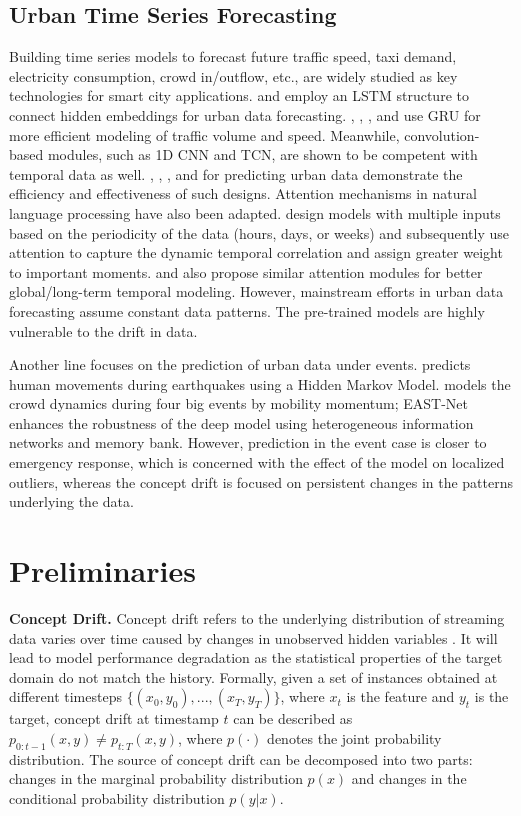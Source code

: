 \documentclass[sigconf]{acmart}
\begin{document}
\subsection{Urban Time Series Forecasting}
Building time series models to forecast future traffic speed, taxi demand, electricity consumption, crowd in/outflow, etc., are widely studied as key technologies for smart city applications. \cite{yao2018deep} and \cite{cui2019traffic} employ an LSTM structure to connect hidden embeddings for urban data forecasting. \cite{lai2018modeling}, \cite{li2018diffusion}, \cite{bai2020adaptive}, and \cite{zhao2019t} use GRU for more efficient modeling of traffic volume and speed.  Meanwhile, convolution-based modules, such as 1D CNN and TCN, are shown to be competent with temporal data as well. \cite{yu2018spatio}, \cite{shih2019temporal}, \cite{wu2019graph}, and \cite{wu2020connecting} for predicting urban data demonstrate the efficiency and effectiveness of such designs. Attention mechanisms in natural language processing have also been adapted. \cite{yao2019revisiting,guo2019attention} design models with multiple inputs based on the periodicity of the data (hours, days, or weeks) and subsequently use attention to capture the dynamic temporal correlation and assign greater weight to important moments. \cite{zheng2020gman} and \cite{xu2020spatial} also propose similar attention modules for better global/long-term temporal modeling. However, mainstream efforts in urban data forecasting assume constant data patterns. The pre-trained models are highly vulnerable to the drift in data.

Another line focuses on the prediction of urban data under events. \cite{song2014prediction} predicts human movements during earthquakes using a Hidden Markov Model. \cite{jiang2019deepurbanevent,jiang2023learning} models the crowd dynamics during four big events by mobility momentum; EAST-Net \cite{wang2022event} enhances the robustness of the deep model using heterogeneous information networks and memory bank. However, prediction in the event case is closer to emergency response, which is concerned with the effect of the model on localized outliers, whereas the concept drift is focused on persistent changes in the patterns underlying the data.

\section{Preliminaries}
\textbf{Concept Drift.} Concept drift refers to the underlying distribution of streaming data varies over time caused by changes in unobserved hidden variables \cite{lu2018learning}. It will lead to model performance degradation as the statistical properties of the target domain do not match the history. Formally, given a set of instances obtained at different timesteps $\{(x_0, y_0),..., (x_T, y_T)\}$, where $x_{t}$ is the feature and $y_{t}$ is the target, concept drift at timestamp $t$ can be described as $p_{0:t-1}(x,y)\ne p_{t:T}(x,y)$, where $p(\cdot)$ denotes the joint probability distribution. The source of concept drift can be decomposed into two parts: changes in the marginal probability distribution $p(x)$ and changes in the conditional probability distribution $p(y|x)$.
\end{document}
